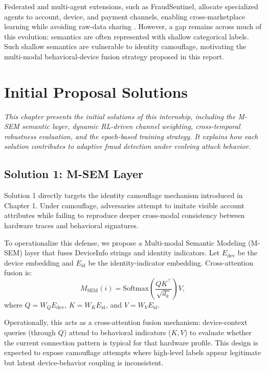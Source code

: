 \documentclass[12pt,a4paper]{report}
\newcommand{\chapterdesc}[1]{%
    \vspace{-0.6\baselineskip}
    \noindent\hspace*{1.5cm}\parbox{\dimexpr\textwidth-1.5cm\relax}{\textit{#1}}
    \par\vspace{0.3\baselineskip}
}
\begin{document}
Federated and multi-agent extensions, such as FraudSentinel, allocate specialized agents to account, device, and payment channels, enabling cross-marketplace learning while avoiding raw-data sharing \cite{fraudsentinel,fedavg}. However, a gap remains across much of this evolution: semantics are often represented with shallow categorical labels. Such shallow semantics are vulnerable to identity camouflage, motivating the multi-modal behavioral-device fusion strategy proposed in this report.

\chapter{Initial Proposal Solutions}
\chapterdesc{This chapter presents the initial solutions of this internship, including the M-SEM semantic layer, dynamic RL-driven channel weighting, cross-temporal robustness evaluation, and the epoch-based training strategy. It explains how each solution contributes to adaptive fraud detection under evolving attack behavior.}

\section{Solution 1: M-SEM Layer}
Solution 1 directly targets the identity camouflage mechanism introduced in Chapter 1. Under camouflage, adversaries attempt to imitate visible account attributes while failing to reproduce deeper cross-modal consistency between hardware traces and behavioral signatures.

To operationalize this defense, we propose a Multi-modal Semantic Modeling (M-SEM) layer that fuses DeviceInfo strings and identity indicators. Let $E_{\mathrm{dev}}$ be the device embedding and $E_{\mathrm{id}}$ be the identity-indicator embedding. Cross-attention fusion is:
\begin{equation}
M_{\mathrm{SEM}}(i)=\mathrm{Softmax}\left(\frac{QK^\top}{\sqrt{d_k}}\right)V,
\end{equation}
where $Q=W_QE_{\mathrm{dev}}$, $K=W_KE_{\mathrm{id}}$, and $V=W_VE_{\mathrm{id}}$.

Operationally, this acts as a cross-attention fusion mechanism: device-context queries (through $Q$) attend to behavioral indicators ($K,V$) to evaluate whether the current connection pattern is typical for that hardware profile. This design is expected to expose camouflage attempts where high-level labels appear legitimate but latent device-behavior coupling is inconsistent.
\end{document}
